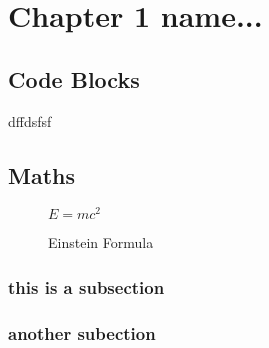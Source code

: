 \chapter{Chapter 1 name...}


\section{Code Blocks}

dffdsfsf


\section{Maths}

\begin{figure}[ht]
    \centering
    \begin{math}
        E=mc^2
    \end{math}
    \caption{Einstein Formula}
    \label{fig:Emc2}
\end{figure}

\subsection{this is a subsection}

\lipsum[7-8]

\subsection{another subection}

\lipsum[4-6]
